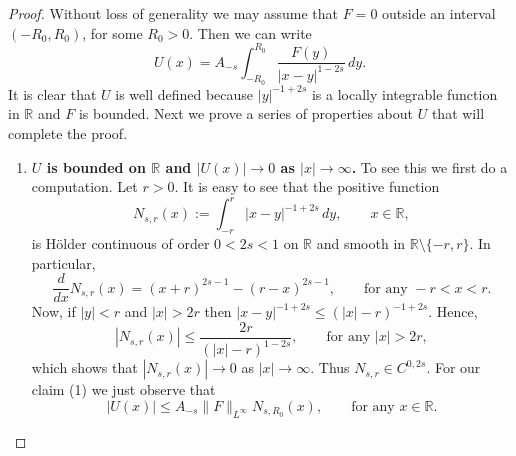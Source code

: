 \documentclass[a4paper,11pt,reqno]{amsart}
\newcommand{\R}{\mathbb{R}}
\theoremstyle{definition}
\numberwithin{equation}{section}
\begin{document}
\begin{proof}
Without loss of generality we may assume
that $F=0$ outside an interval $(-R_0,R_0)$, for some $R_0>0$. Then we can write
$$
U(x)=A_{-s}\int_{-R_0}^{R_0}\frac{F(y)}{|x-y|^{1-2s}}\,dy.
$$
It is clear that $U$ is well defined because $|y|^{-1+2s}$ is a locally integrable function in $\R$
and $F$ is bounded.
Next we prove a series of properties about $U$ that will complete the proof.

\begin{enumerate}[$(1)$]

\item \textbf{$U$ is bounded on $\R$ and $|U(x)|\to0$ as $|x|\to\infty$.}
To see this we first do a computation. Let $r>0$.
It is easy to see that the positive function
$$
N_{s,r}(x):=\int_{-r}^r|x-y|^{-1+2s}\,dy,\qquad x\in\R,
$$
is H\"older continuous of order $0<2s<1$ on $\R$
and smooth in $\R\setminus\{-r,r\}$. In particular,
\begin{equation}
\label{N}
\frac{d}{dx}N_{s,r}(x)=(x+r)^{2s-1}-(r-x)^{2s-1},\qquad\text{for any } -r<x<r.
\end{equation}
Now, if $|y|<r$ and $|x|>2r$ then $|x-y|^{-1+2s}\leq
(|x|-r)^{-1+2s}$. Hence,
$$
|N_{s,r}(x)|\leq\frac{2r}{(|x|-r)^{1-2s}},\qquad\text{for any } |x|>2r,
$$
which shows that $|N_{s,r}(x)|\to 0$ as $|x|\to\infty$. Thus $N_{s,r}\in C^{0,2s}$.
For our claim (1) we just observe that
\begin{equation}
\label{acotaciondeUporF}
|U(x)|\leq A_{-s}\|F\|_{L^\infty}N_{s,R_0}(x),\qquad\text{for any } x\in\R.
\end{equation}


\end{enumerate}
\end{proof}
\end{document}
